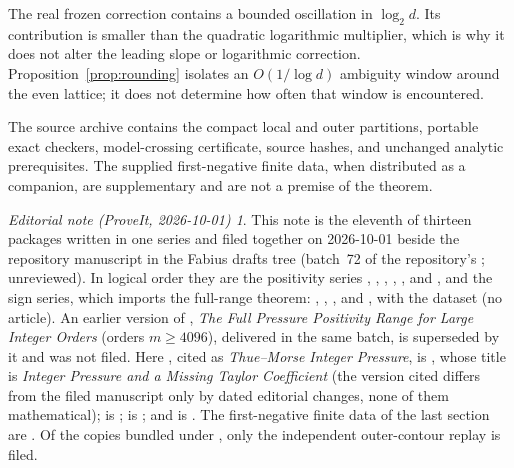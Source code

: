 \documentclass[11pt,a4paper]{article}
\theoremstyle{remark}\newtheorem*{ednote}{Editorial note (ProveIt, 2026-10-01)}
\begin{document}
The real frozen correction contains a bounded oscillation in $\log_2d$. Its contribution is smaller than the quadratic logarithmic multiplier, which is why it does not alter the leading slope or logarithmic correction. Proposition~\ref{prop:rounding} isolates an $O(1/\log d)$ ambiguity window around the even lattice; it does not determine how often that window is encountered.

The source archive contains the compact local and outer partitions, portable exact checkers, model-crossing certificate, source hashes, and unchanged analytic prerequisites. The supplied first-negative finite data, when distributed as a companion, are supplementary and are not a premise of the theorem.

\begin{ednote}
This note is the eleventh of thirteen packages written in one series and filed together on 2026-10-01 beside the repository manuscript  in the Fabius drafts tree (batch~72 of the repository's ; unreviewed). In logical order they are the positivity series , , , , ,  and , and the sign series, which imports the full-range theorem: , , ,  and , with the dataset  (no article). An earlier version of , \emph{The Full Pressure Positivity Range for Large Integer Orders} (orders $m\ge4096$), delivered in the same batch, is superseded by it and was not filed.
Here \cite{Repo}, cited as \emph{Thue--Morse Integer Pressure}, is , whose title
is \emph{Integer Pressure and a Missing Taylor Coefficient} (the version cited differs from the filed manuscript only by dated editorial changes, none of them mathematical); \cite{AllOrders}
is ; \cite{Bound66} is ; and
\cite{Signs} is . The first-negative finite data of the last
section are . Of the copies bundled under ,
only the independent outer-contour replay  is
filed.
\end{ednote}
\end{document}

